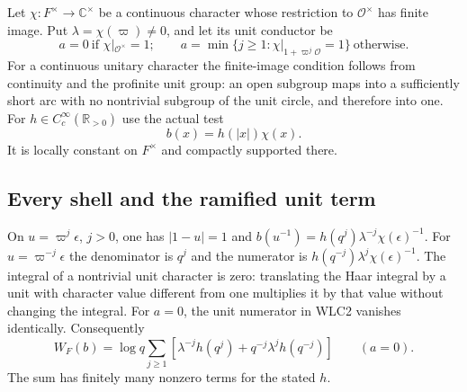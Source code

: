 Let $\chi:F^\times\to\mathbb C^\times$ be a continuous character
whose restriction to $\mathcal O^\times$ has finite image.
Put $\lambda=\chi(\varpi)\ne0$, and let its unit conductor be
\begin{equation}\tag{WLC3}
 a=0\ \text{if }\chi|_{\mathcal O^\times}=1;
 \qquad
 a=\min\{j\ge1:\chi|_{1+\varpi^j\mathcal O}=1\}
 \ \text{otherwise}.
\end{equation}
For a continuous unitary character the finite-image condition
follows from continuity and the profinite unit group: an open
subgroup maps into a sufficiently short arc with no nontrivial
subgroup of the unit circle, and therefore into one.
For $h\in C_c^\infty(\mathbb R_{>0})$ use the actual test
\begin{equation}\tag{WLC4}
 b(x)=h(|x|)\chi(x).
\end{equation}
It is locally constant on $F^\times$ and compactly supported there.

\subsection{Every shell and the ramified unit term}

On $u=\varpi^j\epsilon$, $j>0$, one has
$|1-u|=1$ and
$b(u^{-1})=h(q^j)\lambda^{-j}\chi(\epsilon)^{-1}$.
For $u=\varpi^{-j}\epsilon$ the denominator is $q^j$ and
the numerator is $h(q^{-j})\lambda^j\chi(\epsilon)^{-1}$.
The integral of a nontrivial unit character is zero: translating
the Haar integral by a unit with character value different from
one multiplies it by that value without changing the integral.
For $a=0$, the unit numerator in WLC2 vanishes identically.
Consequently
\begin{equation}\tag{WLC5}
 W_F(b)=\log q\sum_{j\ge1}
 \left[\lambda^{-j}h(q^j)+q^{-j}\lambda^jh(q^{-j})\right]
 \qquad(a=0).
\end{equation}
The sum has finitely many nonzero terms for the stated $h$.

